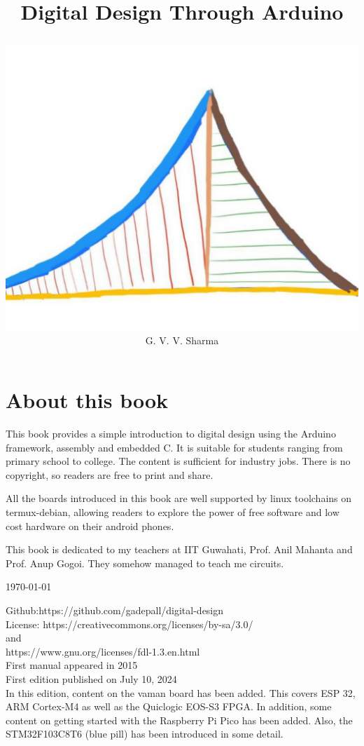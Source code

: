 \documentclass[journal]{IEEEtran}
\begin{document}

\onecolumn


\title{
	\begin{center}
Digital Design Through Arduino
\end{center}
}
\author{
\vspace{11cm}
	\begin{center}
\includegraphics[width=0.2\columnwidth]{figs/logo.jpg}
\\
		{\huge	G. V. V. Sharma}
	\end{center}
}
\maketitle

\newpage

\section*{About this book}
This book provides a simple introduction to digital design using the Arduino framework, assembly and embedded C.  It is suitable for students ranging from primary school to college.  The content is sufficient for  industry jobs.
There is no copyright, so readers are free to print and share.

All the boards introduced in this book are well supported by linux toolchains on termux-debian, allowing readers to explore the power of free software and low cost hardware on their android phones.

This book is dedicated to my teachers at IIT Guwahati, Prof. Anil Mahanta and Prof. Anup Gogoi.  They somehow managed to teach me circuits. 
\begin{flushright}
	\today
\end{flushright}
Github:https://github.com/gadepall/digital-design
\\
License: https://creativecommons.org/licenses/by-sa/3.0/
\\
and
\\
https://www.gnu.org/licenses/fdl-1.3.en.html
\\
First manual appeared in 2015
\\
First edition published on July 10, 2024
\\
In this edition, content on the vaman board has been added.  This covers ESP 32, ARM Cortex-M4 as well as the Quiclogic EOS-S3 FPGA. In addition, some content on getting started with the Raspberry Pi Pico has been added.  Also, the STM32F103C8T6 (blue pill) has been introduced in some detail.
\newpage
\tableofcontents
\end{document}
